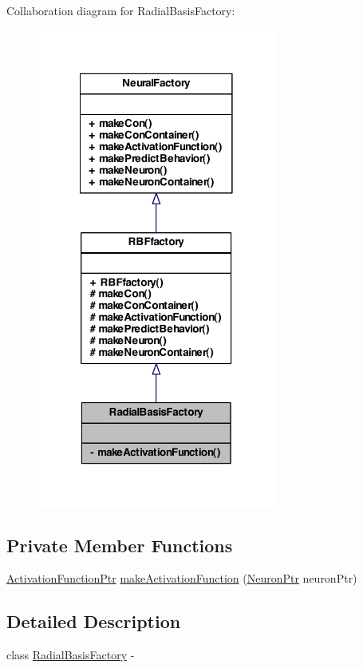 Collaboration diagram for RadialBasisFactory:
\nopagebreak
\begin{figure}[H]
\begin{center}
\leavevmode
\includegraphics[width=222pt]{class_radial_basis_factory__coll__graph}
\end{center}
\end{figure}
\subsection*{Private Member Functions}
\begin{DoxyCompactItemize}
\item 
\hyperlink{_a_m_o_r_e_8h_a77602a0277a02e5769c3df0adc669b17}{ActivationFunctionPtr} \hyperlink{class_radial_basis_factory_ae68ec682e8f04e99e5a1560e347b7735}{makeActivationFunction} (\hyperlink{_a_m_o_r_e_8h_ac1ea936c2c7728eb382278131652fef4}{NeuronPtr} neuronPtr)
\end{DoxyCompactItemize}


\subsection{Detailed Description}
class \hyperlink{class_radial_basis_factory}{RadialBasisFactory} -\/ 

